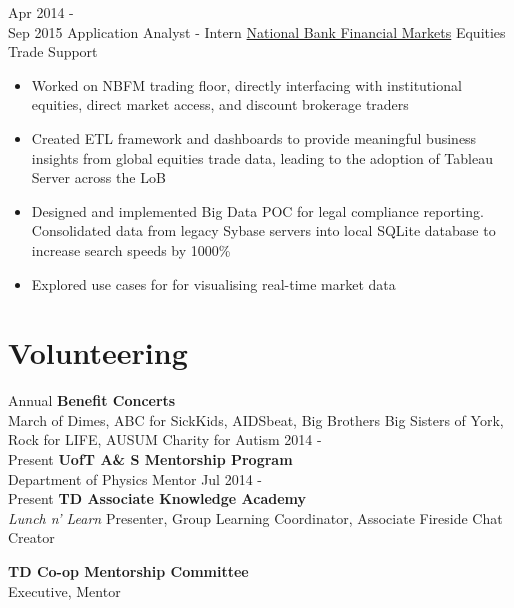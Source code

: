 \documentclass[letterpaper]{twentysecondcv} %
\begin{document}
\begin{twenty}
     \twentyitem
   		{Apr 2014 - \\ Sep 2015}
        {Application Analyst - Intern}
        {\href{http://nbfm.ca/}{National Bank Financial Markets}}
        {Equities Trade Support}
        {
        \begin{itemize}
		\item Worked on NBFM trading floor, directly interfacing with institutional equities, direct market access, and discount brokerage traders
        \item Created ETL framework and  dashboards to provide meaningful business insights from global equities trade data, leading to the adoption of Tableau Server across the LoB
        \item Designed and implemented  Big Data POC for legal compliance reporting. Consolidated data from legacy Sybase servers into local SQLite database to increase search speeds by 1000\% 
        \item Explored use cases for  for visualising real-time market data
	    \end{itemize}
    	}
        
\end{twenty}

\vfill
\section{Volunteering}
\begin{twentyshort}
\twentyitemshort
		{Annual}
		{\textbf{Benefit Concerts} \\ March of Dimes, ABC for SickKids, AIDSbeat, Big Brothers Big Sisters of York, Rock for LIFE, AUSUM Charity for Autism}
\twentyitemshort
   		{2014 - \\ Present}
        {\textbf{UofT A\& S Mentorship Program} \\ Department of Physics Mentor}
\twentyitemshort
   		{Jul 2014 - \\ Present}
        {\textbf{TD Associate Knowledge Academy} \\ \emph{Lunch n' Learn} Presenter, Group Learning Coordinator, Associate Fireside Chat Creator}

\twentyitemshort
   		{}
        {\textbf{TD Co-op Mentorship Committee} \\ Executive, Mentor}
\end{twentyshort}

\vfill
\end{document}
